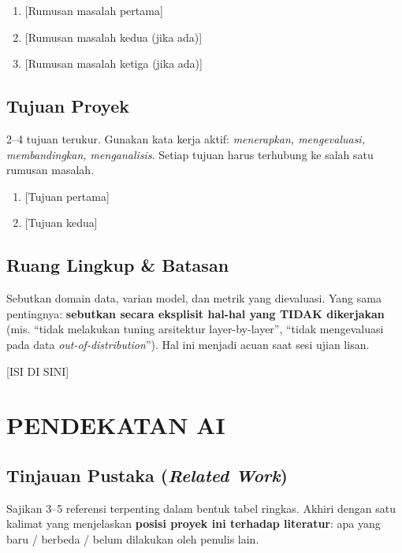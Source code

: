 \documentclass[11pt,a4paper,oneside]{report}
\begin{document}
\begin{enumerate}[label=RM\arabic*.,leftmargin=*]
    \item {[Rumusan masalah pertama]}
    \item {[Rumusan masalah kedua (jika ada)]}
    \item {[Rumusan masalah ketiga (jika ada)]}
\end{enumerate}

\section{Tujuan Proyek}
\begin{petunjuk}
2--4 tujuan terukur. Gunakan kata kerja aktif: \textit{menerapkan, mengevaluasi, membandingkan, menganalisis}. Setiap tujuan harus terhubung ke salah satu rumusan masalah.
\end{petunjuk}

\begin{enumerate}[label=T\arabic*.,leftmargin=*]
    \item {[Tujuan pertama]}
    \item {[Tujuan kedua]}
\end{enumerate}

\section{Ruang Lingkup \& Batasan}
\begin{petunjuk}
Sebutkan domain data, varian model, dan metrik yang dievaluasi. Yang sama pentingnya: \textbf{sebutkan secara eksplisit hal-hal yang TIDAK dikerjakan} (mis. ``tidak melakukan tuning arsitektur layer-by-layer'', ``tidak mengevaluasi pada data \textit{out-of-distribution}''). Hal ini menjadi acuan saat sesi ujian lisan.
\end{petunjuk}

[ISI DI SINI]

\chapter{PENDEKATAN AI}
\label{bab:pendekatan}

\section{Tinjauan Pustaka (\textit{Related Work})}
\begin{petunjuk}
Sajikan 3--5 referensi terpenting dalam bentuk tabel ringkas. Akhiri dengan satu kalimat yang menjelaskan \textbf{posisi proyek ini terhadap literatur}: apa yang baru / berbeda / belum dilakukan oleh penulis lain.
\end{petunjuk}
\end{document}
